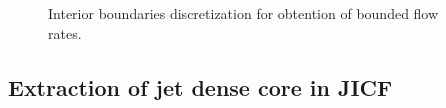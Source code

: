 \clearpage

\begin{figure}[ht]
     \centering
     \caption{Interior boundaries discretization for obtention of bounded flow rates.}
      \label{fig:jicf_IBs_sketch_discretization}
\end{figure}



%

\subsection{Extraction of jet dense core in JICF}

